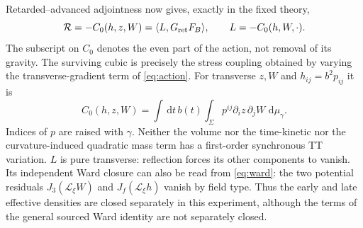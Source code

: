 \documentclass[11pt]{article}
\newcommand{\dd}{\,\mathrm d}
\newcommand{\Lie}{\mathcal L}
\newcommand{\Rret}{G_{\rm ret}}
\numberwithin{equation}{section}
\begin{document}
Retarded--advanced adjointness now gives, exactly in the fixed theory,
\begin{equation}
 \mathcal R=-C_0(h,z,W)=\langle L,\Rret F_B\rangle,\qquad
                  L=-C_0(h,W,\cdot).
 \label{eq:isolated}
\end{equation}
The subscript on $C_0$ denotes the even part of the action, not removal of its gravity. The surviving cubic is precisely the stress coupling obtained by varying the transverse-gradient term of \eqref{eq:action}. For transverse $z,W$ and $h_{ij}=b^2p_{ij}$ it is
\begin{equation}
 C_0(h,z,W)=\int\dd t\, b(t)\int_\Sigma p^{ij}\partial_i z\,\partial_jW
                                                  \,\dd\mu_\gamma .
 \label{eq:stress}
\end{equation}
Indices of $p$ are raised with $\gamma$. Neither the volume nor the time-kinetic nor the curvature-induced quadratic mass term has a first-order synchronous TT variation. $L$ is pure transverse: reflection forces its other components to vanish. Its independent Ward closure can also be read from \eqref{eq:ward}: the two potential residuals $J_3(\Lie_\xi W)$ and $J_f(\Lie_\xi h)$ vanish by field type. Thus the early and late effective densities are closed separately in this experiment, although the terms of the general sourced Ward identity are not separately closed.
\end{document}
